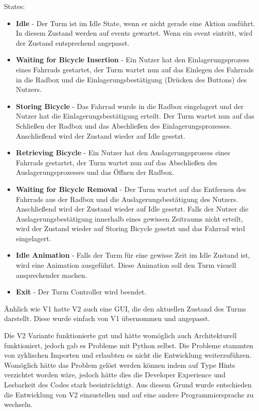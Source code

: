 States:
\begin{itemize}
  \item \textbf{Idle} - Der Turm ist im Idle State, wenn er nicht gerade eine Aktion ausführt. In diesem Zustand werden auf \Glspl{event} gewartet. Wenn ein \Gls{event} eintritt, wird der Zustand entsprechend angepasst.
  \item \textbf{Waiting for Bicycle Insertion} - Ein Nutzer hat den Einlagerungsprozess eines Fahrrads gestartet, der Turm wartet nun auf das Einlegen des Fahrrads in die Radbox und die Einlagerungsbestätigung (Drücken des Buttons) des Nutzers.
  \item \textbf{Storing Bicycle} - Das Fahrrad wurde in die Radbox eingelagert und der Nutzer hat die Einlagerungsbestätigung erteilt. Der Turm wartet nun auf das Schließen der Radbox und das Abschließen des Einlagerungsprozesses. Anschließend wird der Zustand wieder auf Idle gesetzt.
  \item \textbf{Retrieving Bicycle} - Ein Nutzer hat den Auslagerungsprozess eines Fahrrads gestartet, der Turm wartet nun auf das Abschließen des Auslagerungsprozesses und das Öffnen der Radbox.
  \item \textbf{Waiting for Bicycle Removal} - Der Turm wartet auf das Entfernen des Fahrrads aus der Radbox und die Auslagerungsbestätigung des Nutzers. Anschließend wird der Zustand wieder auf Idle gesetzt. Falls der Nutzer die Auslagerungsbestätigung innerhalb eines gewissen Zeitraums nicht erteilt, wird der Zustand wieder auf Storing Bicycle gesetzt und das Fahrrad wird eingelagert.
  \item \textbf{Idle Animation} - Falls der Turm für eine gewisse Zeit im Idle Zustand ist, wird eine Animation ausgeführt. Diese Animation soll den Turm visuell ansprechender machen.
  \item \textbf{Exit} - Der Turm Controller wird beendet.
\end{itemize}

Änhlich wie V1 hatte V2 auch eine \ac{GUI}, die den aktuellen Zustand des Turms darstellt. Diese wurde einfach von V1 übernommen und angepasst.

Die V2 Variante funktionierte gut und hätte womöglich auch Architekturell funktioniert, jedoch gab es Probleme mit Python selbst. Die Probleme stammten von zyklischen Importen und erlaubten es nicht die Entwicklung weiterzuführen. Womöglich hätte das Problem gelöst werden können indem auf Type Hints verzichtet worden wäre, jedoch hätte dies die Developer Experience und Lesbarkeit des Codes stark beeinträchtigt. Aus diesem Grund wurde entschieden die Entwicklung von V2 einzustellen und auf eine andere Programmiersprache zu wechseln.


